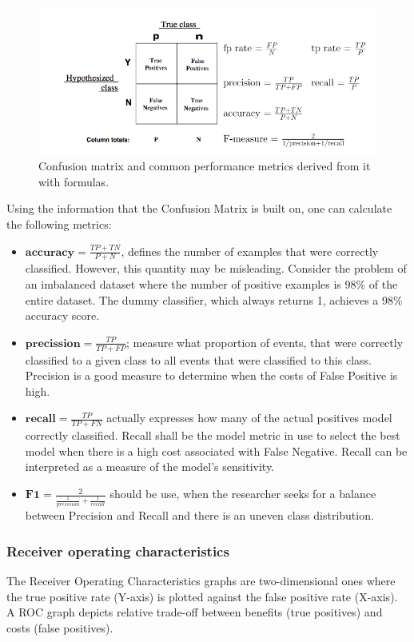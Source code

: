 \begin{figure}[h]
\hspace*{-2cm}                                                           
\includegraphics[scale=1.3]{figures/ConfusionMatrix.png}
\caption{Confusion matrix and common performance metrics derived from it with formulas. 
\label{fig:CM}}
\end{figure}

Using the information that the Confusion Matrix is built on, one can calculate the following metrics:

\begin{itemize}
    \item $\mathbf{accuracy} = \frac{TP+TN}{P+N}$, defines the number of examples that were correctly classified. However, this quantity may be misleading. Consider the problem of an imbalanced dataset where the number of positive examples is 98\% of the entire dataset. The dummy classifier, which always returns 1, achieves a 98\% accuracy score.
    \item $\mathbf{precission}=\frac{TP}{TP+FP}$; measure what proportion of events, that were correctly classified to a given class to all events that were classified to this class. Precision is a good measure to determine when the costs of False Positive is high. 
    \item $\mathbf{recall}=\frac{TP}{TP+FN}$ actually expresses how many of the actual positives model correctly classified. Recall shall be the model metric in use to select the best model when there is a high cost associated with False Negative. Recall can be interpreted as a measure of the model's sensitivity.
    \item $\mathbf{F1} =\frac{2}{\frac{1}{precision}+ \frac{1}{recall}}$ should be use, when the researcher seeks for a balance between Precision and Recall and there is an uneven class distribution. 
\end{itemize}

\subsubsection{Receiver operating characteristics}
\label{sec:ROC}
The Receiver Operating Characteristics graphs are two-dimensional ones where the true positive
rate (Y-axis) is plotted against the false positive rate (X-axis). A ROC graph depicts relative trade-off between benefits (true positives) and costs (false positives).

